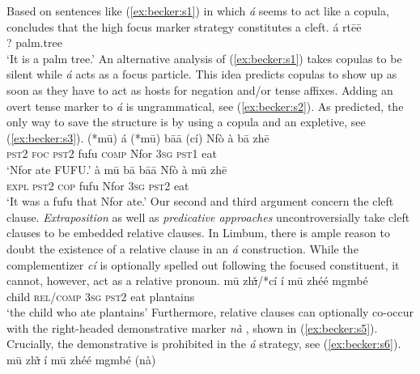 \documentclass[output=paper,
modfonts
]{langscibook}
\begin{document}
Based on sentences like (\ref{ex:becker:s1}) in which \textit{\'a} seems to act like a copula, \citet[][301]{Fransen1995} concludes that the high focus marker strategy constitutes a cleft.
\ea \label{ex:becker:s1}
\gll \'a rt\=e\=e\\  
     ? palm.tree\\ 
\glt `It is a palm tree.'
\z
An alternative analysis of (\ref{ex:becker:s1}) takes copulas to be silent while \textit{\'a} acts as a focus particle. This idea predicts copulas to show up as soon as they have to act as hosts for negation and/or tense affixes. Adding an overt tense marker to \textit{\'a} is ungrammatical, see (\ref{ex:becker:s2}). As predicted, the only way to save the structure is by using a copula and an expletive, see (\ref{ex:becker:s3}).
\ea \label{ex:becker:s2}
\gll (*m\=u) \'{a} (*m\=u) b\=a\=a (c\'i) Nf\`{o} \`{a} b\=a zh\=e \\  
     \textsc{pst2} \textsc{foc} \textsc{pst2} fufu \textsc{comp} Nfor  \textsc{3sg} \textsc{pst1} eat \\ 
\glt `Nfor ate FUFU.'
\z
\ea \label{ex:becker:s3}
\gll à m\=u b\=a b\=a\=a Nf\`{o} \`{a} m\=u zh\=e \\  
     \textsc{expl} \textsc{pst2} \textsc{cop} fufu Nfor  \textsc{3sg} \textsc{pst2} eat \\ 
\glt `It was a fufu that Nfor ate.'
\z
Our second and third argument concern the cleft clause. \textit{Extraposition} \citep{Akmajian1970,Gundel1977,Percus1997} as well as \textit{predicative approaches} \citep{Svenious1998,Hedberg2000,Reeve2011} uncontroversially take cleft clauses to be embedded relative clauses. In Limbum, there is ample reason to doubt the existence of a relative clause in an {\em \'a} construction. While the complementizer \textit{c\'i} is optionally spelled out following the focused constituent, it cannot, however, act as a relative pronoun. 
\ea \label{ex:becker:s4}
\gll m\=u  {zh\sout{\v{\i}}}/*c\'i \'i m\=u zh\'e\'e mgmb\'e \\  
     child \textsc{rel/comp} \textsc{3sg} \textsc{pst2} eat plantains \\ 
\glt `the child who ate plantains'
\z
Furthermore, relative clauses can optionally co-occur with the right-headed demonstrative marker \textit{n\`a} \citep{Fransen1995,Mpoche1993}, shown in (\ref{ex:becker:s5}). Crucially, the demonstrative is prohibited in the \textit{\'a} strategy, see (\ref{ex:becker:s6}).
\ea \label{ex:becker:s5}
\gll m\=u zh\sout{\v{\i}} \'i m\=u zh\'e\'e mgmb\'e ({n\`a}) \\  
\end{document}
